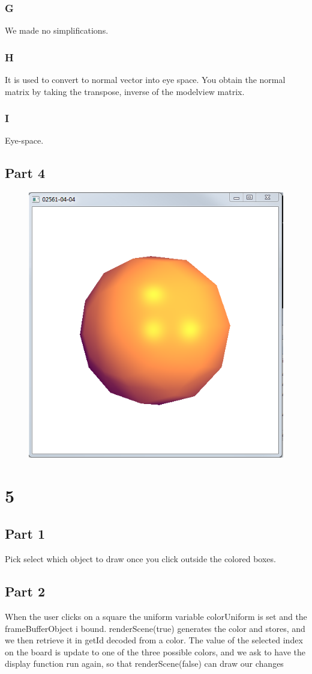 \documentclass[11pt]{article}
\begin{document}
\subsubsection{G}
We made no simplifications.


\subsubsection{H}
It is used to convert to normal vector into eye space. You obtain the normal matrix by taking the transpose, inverse of the modelview matrix.


\subsubsection{I}
Eye-space.

\subsection{Part 4}
\begin{figure}[H]
	\centering
	\includegraphics[width=0.5\linewidth]{images/e04p4}
	\label{fig:e04p4}
\end{figure}

\section{5}
\subsection{Part 1}
Pick select which object to draw once you click outside the colored boxes.

\subsection{Part 2}
When the user clicks on a square the uniform variable colorUniform is set and the frameBufferObject i bound. renderScene(true) generates the color and stores, and we then retrieve it in getId decoded from a color. The value of the selected index on the board is update to one of the three possible colors, and we ask to have the display function run again, so that renderScene(false) can draw our changes
\end{document}
